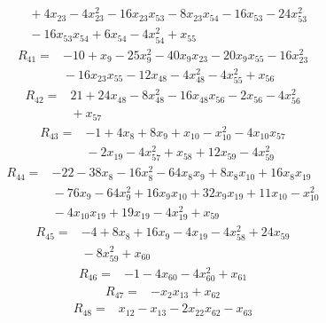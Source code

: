 {\begin{align*}
&{}  + 4x_{23} - 4x_{23}^{2} - 16x_{23} x_{53} - 8x_{23} x_{54} - 16x_{53} - 24x_{53}^{2} \\
&{}  - 16x_{53} x_{54} + 6x_{54} - 4x_{54}^{2} + x_{55}
\end{align*}
\begin{align*}
R_{41} ={}& -10 + x_{9} - 25x_{9}^{2} - 40x_{9} x_{23} - 20x_{9} x_{55} - 16x_{23}^{2} \\
&{}  - 16x_{23} x_{55} - 12x_{48} - 4x_{48}^{2} - 4x_{55}^{2} + x_{56}
\end{align*}
\begin{align*}
R_{42} ={}& 21 + 24x_{48} - 8x_{48}^{2} - 16x_{48} x_{56} - 2x_{56} - 4x_{56}^{2} \\
&{}  + x_{57}
\end{align*}
\begin{align*}
R_{43} ={}& -1 + 4x_{8} + 8x_{9} + x_{10} - x_{10}^{2} - 4x_{10} x_{57} \\
&{}  - 2x_{19} - 4x_{57}^{2} + x_{58} + 12x_{59} - 4x_{59}^{2}
\end{align*}
\begin{align*}
R_{44} ={}& -22 - 38x_{8} - 16x_{8}^{2} - 64x_{8} x_{9} + 8x_{8} x_{10} + 16x_{8} x_{19} \\
&{}  - 76x_{9} - 64x_{9}^{2} + 16x_{9} x_{10} + 32x_{9} x_{19} + 11x_{10} - x_{10}^{2} \\
&{}  - 4x_{10} x_{19} + 19x_{19} - 4x_{19}^{2} + x_{59}
\end{align*}
\begin{align*}
R_{45} ={}& -4 + 8x_{8} + 16x_{9} - 4x_{19} - 4x_{58}^{2} + 24x_{59} \\
&{}  - 8x_{59}^{2} + x_{60}
\end{align*}
\begin{align*}
R_{46} ={}& -1 - 4x_{60} - 4x_{60}^{2} + x_{61}
\end{align*}
\begin{align*}
R_{47} ={}& -x_{2} x_{13} + x_{62}
\end{align*}
\begin{align*}
R_{48} ={}& x_{12} - x_{13} - 2x_{22} x_{62} - x_{63}
\end{align*}
\begin{align*}

\end{align*}}

